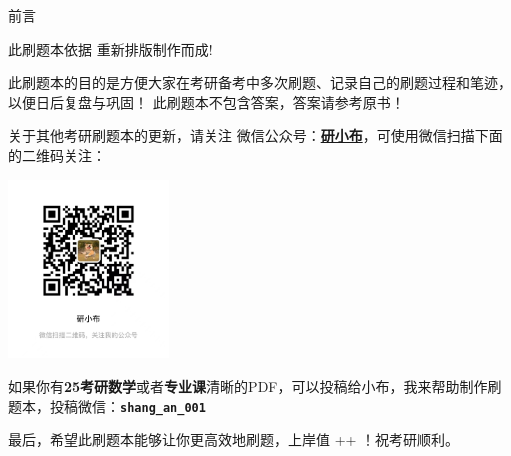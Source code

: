 \clearpage
\vspace*{0mm} %
\begin{center}
    \large \heiti 前言
\end{center}

\hspace*{2em}此刷题本依据 \underline{\textbf{\preBookName}}重新排版制作而成! 


\hspace*{2em}此刷题本的目的是方便大家在考研备考中多次刷题、记录自己的刷题过程和笔迹，以便日后复盘与巩固！
此刷题本不包含答案，答案请参考原书！

\hspace*{2em}关于其他考研刷题本的更新，请关注 \faWeixin 微信公众号：\underline{\textbf{研小布}}，可使用微信扫描下面的二维码关注：


\begin{minipage}[t]{1.0\textwidth}
    \centering
    \includegraphics[width=0.32\textwidth]{img/qr01.jpg} 
\end{minipage}

\hspace*{2em}如果你有\textbf{25考研数学}或者\textbf{专业课}清晰的PDF，可以投稿给小布，我来帮助制作刷题本，投稿微信：\textbf{\texttt{shang\_an\_001}}

\hspace*{2em}最后，希望此刷题本能够让你更高效地刷题，上岸值 ++ ！祝考研顺利。
\clearpage